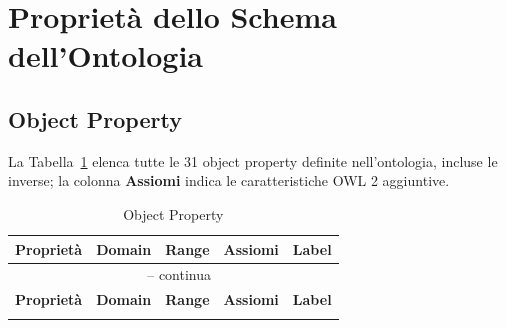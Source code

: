 \section{Propriet\`a dello Schema dell'Ontologia}
\label{sec:tbox_proprieta}

\subsection{Object Property}

La Tabella~\ref{tab:objprop} elenca tutte le 31 object property definite nell'ontologia,
incluse le inverse; la colonna \textbf{Assiomi} indica le caratteristiche OWL 2 aggiuntive.

\begingroup\footnotesize\setlength{\tabcolsep}{3pt}
\begin{longtable}{lllll}
\caption{Object Property}\label{tab:objprop}\\
\toprule
\textbf{Propriet\`a}      & \textbf{Domain} & \textbf{Range}   & \textbf{Assiomi}                 & \textbf{Label} \\
\midrule
\endfirsthead
\multicolumn{5}{c}{\tablename\ \thetable{} -- continua} \\
\toprule
\textbf{Propriet\`a}      & \textbf{Domain} & \textbf{Range}   & \textbf{Assiomi}                 & \textbf{Label} \\
\midrule
\endhead
\bottomrule
\endlastfoot


\end{longtable}

